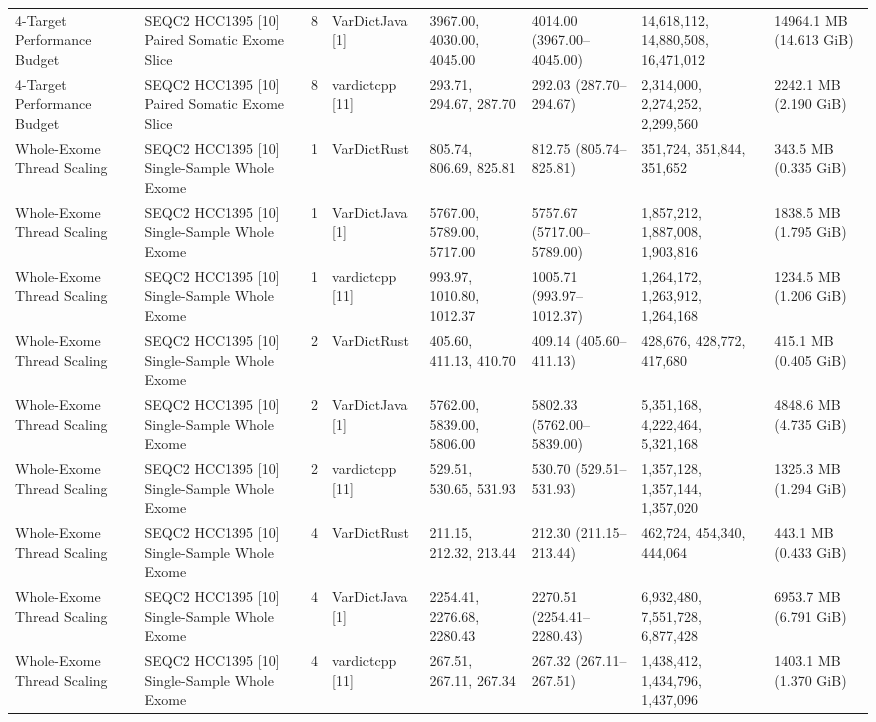 \begin{table}[htbp]
{\begin{tabular}{llllllll}
4-Target Performance Budget & SEQC2 HCC1395 [10] Paired Somatic Exome Slice & 8 & VarDictJava [1] & 3967.00, 4030.00, 4045.00 & 4014.00 (3967.00--4045.00) & 14,618,112, 14,880,508, 16,471,012 & 14964.1 MB (14.613 GiB) \\
4-Target Performance Budget & SEQC2 HCC1395 [10] Paired Somatic Exome Slice & 8 & vardictcpp [11] & 293.71, 294.67, 287.70 & 292.03 (287.70--294.67) & 2,314,000, 2,274,252, 2,299,560 & 2242.1 MB (2.190 GiB) \\
Whole-Exome Thread Scaling & SEQC2 HCC1395 [10] Single-Sample Whole Exome & 1 & VarDictRust & 805.74, 806.69, 825.81 & 812.75 (805.74--825.81) & 351,724, 351,844, 351,652 & 343.5 MB (0.335 GiB) \\
Whole-Exome Thread Scaling & SEQC2 HCC1395 [10] Single-Sample Whole Exome & 1 & VarDictJava [1] & 5767.00, 5789.00, 5717.00 & 5757.67 (5717.00--5789.00) & 1,857,212, 1,887,008, 1,903,816 & 1838.5 MB (1.795 GiB) \\
Whole-Exome Thread Scaling & SEQC2 HCC1395 [10] Single-Sample Whole Exome & 1 & vardictcpp [11] & 993.97, 1010.80, 1012.37 & 1005.71 (993.97--1012.37) & 1,264,172, 1,263,912, 1,264,168 & 1234.5 MB (1.206 GiB) \\
Whole-Exome Thread Scaling & SEQC2 HCC1395 [10] Single-Sample Whole Exome & 2 & VarDictRust & 405.60, 411.13, 410.70 & 409.14 (405.60--411.13) & 428,676, 428,772, 417,680 & 415.1 MB (0.405 GiB) \\
Whole-Exome Thread Scaling & SEQC2 HCC1395 [10] Single-Sample Whole Exome & 2 & VarDictJava [1] & 5762.00, 5839.00, 5806.00 & 5802.33 (5762.00--5839.00) & 5,351,168, 4,222,464, 5,321,168 & 4848.6 MB (4.735 GiB) \\
Whole-Exome Thread Scaling & SEQC2 HCC1395 [10] Single-Sample Whole Exome & 2 & vardictcpp [11] & 529.51, 530.65, 531.93 & 530.70 (529.51--531.93) & 1,357,128, 1,357,144, 1,357,020 & 1325.3 MB (1.294 GiB) \\
Whole-Exome Thread Scaling & SEQC2 HCC1395 [10] Single-Sample Whole Exome & 4 & VarDictRust & 211.15, 212.32, 213.44 & 212.30 (211.15--213.44) & 462,724, 454,340, 444,064 & 443.1 MB (0.433 GiB) \\
Whole-Exome Thread Scaling & SEQC2 HCC1395 [10] Single-Sample Whole Exome & 4 & VarDictJava [1] & 2254.41, 2276.68, 2280.43 & 2270.51 (2254.41--2280.43) & 6,932,480, 7,551,728, 6,877,428 & 6953.7 MB (6.791 GiB) \\
Whole-Exome Thread Scaling & SEQC2 HCC1395 [10] Single-Sample Whole Exome & 4 & vardictcpp [11] & 267.51, 267.11, 267.34 & 267.32 (267.11--267.51) & 1,438,412, 1,434,796, 1,437,096 & 1403.1 MB (1.370 GiB) \\

\end{tabular}}
\end{table}
